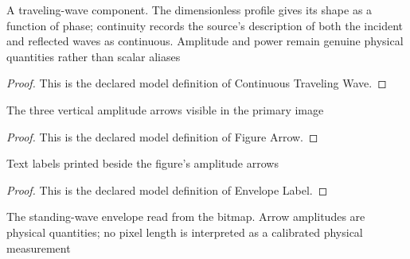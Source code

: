 \begin{definition}
  \label{def:physics:phyx-mini-0307:phyxminiproblems-problemphyxmini0307-continuoustravelingwave}
  A traveling-wave component. The dimensionless profile gives its shape as a function of phase; continuity records the source's description of both the incident and reflected waves as continuous. Amplitude and power remain genuine physical quantities rather than scalar aliases
\end{definition}
\begin{proof}
  This is the declared model definition of Continuous Traveling Wave.
\end{proof}
\begin{definition}
  \label{def:physics:phyx-mini-0307:phyxminiproblems-problemphyxmini0307-figurearrow}
  The three vertical amplitude arrows visible in the primary image
\end{definition}
\begin{proof}
  This is the declared model definition of Figure Arrow.
\end{proof}
\begin{definition}
  \label{def:physics:phyx-mini-0307:phyxminiproblems-problemphyxmini0307-envelopelabel}
  Text labels printed beside the figure's amplitude arrows
\end{definition}
\begin{proof}
  This is the declared model definition of Envelope Label.
\end{proof}
\begin{definition}
  \label{def:physics:phyx-mini-0307:phyxminiproblems-problemphyxmini0307-standingwaveenvelopefigure}
  The standing-wave envelope read from the bitmap. Arrow amplitudes are physical quantities; no pixel length is interpreted as a calibrated physical measurement
\end{definition}
